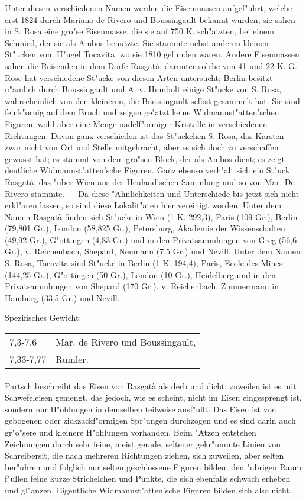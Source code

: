\documentclass[a4paper, 11pt, oneside]{article}
\begin{document}
Unter diesen verschiedenen Namen werden die Eisenmassen aufgef"uhrt, welche erst 1824 durch Mariano de Rivero und Boussingault bekannt wurden; sie sahen in S. Rosa eine gro"se Eisenmasse, die sie auf 750 K. sch"atzten, bei einem Schmied, der sie als Ambos benutzte. Sie stammte nebst anderen kleinen St"ucken vom H"ugel Tocavita, wo sie 1810 gefunden waren. Andere Eisenmassen sahen die Reisenden in dem Dorfe Rasgatà, darunter solche von 41 und 22 K. G. Rose hat verschiedene St"ucke von diesen Arten untersucht; Berlin besitzt n"amlich durch Boussingault und A. v. Humbolt einige St"ucke von S. Rosa, wahrscheinlich von den kleineren, die Boussingault selbst gesammelt hat. Sie sind feink"ornig auf dem Bruch und zeigen ge"atzt keine Widmannst"atten'schen Figuren, wohl aber eine Menge nadelf"ormiger Kristalle in verschiedenen Richtungen. Davon ganz verschieden ist das St"uckchen S. Rosa, das Karsten zwar nicht von Ort und Stelle mitgehracht, aber es sich doch zu verschaffen gewusst hat; es stammt von dem gro"sen Block, der als Ambos dient; es zeigt deutliche Widmannst"atten'sche Figuren. Ganz ebenso verh"alt sich ein St"uck Rasgatà, das "uber Wien aus der Heuland'schen Sammlung und so von Mar. De Rivero stammte. --- Da diese "Ahnlichkeiten und Unterschiede bis jetzt sich nicht erkl"aren lassen, so sind diese Lokalit"aten hier vereinigt worden. Unter dem Namen Rasgatà finden sich St"ucke in Wien (1 K. 292,3), Paris (109 Gr.), Berlin (79,801 Gr.), London (58,825 Gr.), Petersburg, Akademie der Wissenschaften (49,92 Gr.), G"ottingen (4,83 Gr.) und in den Privatsammlungen von Greg (56,6 Gr.), v. Reichenbach, Shepard, Neumann (7,5 Gr.) und Nevill. Unter dem Namen S. Rosa, Tocavita sind St"ucke in Berlin (1 K. 194,4), Paris, Ecole des Mines (144,25 Gr.), G"ottingen (50 Gr.), London (10 Gr.), Heidelberg und in den Privatsammlungen von Shepard (170 Gr.), v. Reichenbach, Zimmermann in Hamburg (33,5 Gr.) und Nevill.

Spezifisches Gewicht:  
\begin{table}[!ht]
    \centering
    \begin{tabular}{l l}
        7,3-7,6 & Mar. de Rivero und Boussingault,\\
        7,33-7,77 & Rumler.
    \end{tabular}
\end{table}
\paragraph{}
Partsch beschreibt das Eisen von Rasgatà als derb und dicht; zuweilen ist es mit Schwefeleisen gemengt, das jedoch, wie es scheint, nicht im Eisen eingesprengt ist, sondern nur H"ohlungen in demselben teilweise ausf"ullt. Das Eisen ist von gebogenen oder zickzackf"ormigen Spr"ungen durchzogen und es sind darin auch gr"o"sere und kleinere H"ohlungen vorhanden. Beim "Atzen entstehen Zeichnungen durch sehr feine, meist gerade, seltener gekr"ummte Linien von Schreibersit, die nach mehreren Richtungen ziehen, sich zuweilen, aber selten ber"uhren und folglich nur selten geschlossene Figuren bilden; den "ubrigen Raum f"ullen feine kurze Strichelchen und Punkte, die sich ebenfalls schwach erheben und gl"anzen. Eigentliche Widmannst"atten'sche Figuren bilden sich also nicht.
\end{document}
